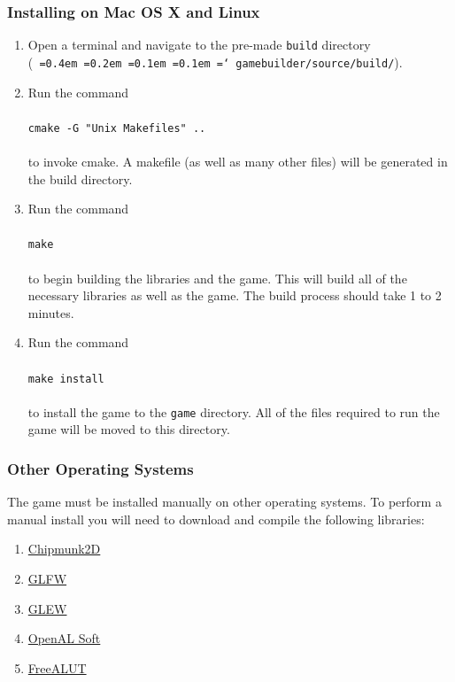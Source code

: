 \documentclass[12pt, titlepage]{article}
\newcommand*\justify{%
  \fontdimen2\font=0.4em%
  \fontdimen3\font=0.2em%
  \fontdimen4\font=0.1em%
  \fontdimen7\font=0.1em%
  \hyphenchar\font=`\-%
}
\begin{document}
\subsubsection{Installing on Mac OS X and Linux}


\begin{enumerate}
  \item Open a terminal and navigate to the pre-made \texttt{build} directory\\ (\texttt{\justify gamebuilder/source/build/}).
  \item Run the command\\\\
   ${}$\qquad \texttt{cmake -G "Unix Makefiles" ..}\\\\
    to invoke cmake.  A makefile (as well as many other files) will be generated in the build directory.

  \item Run the command\\\\
   ${}$\qquad \texttt{make}\\\\
    to begin building the libraries and the game.  This will build all of the necessary libraries as well as the game.  The build process should take 1 to 2 minutes.

  \item Run the command\\\\
  ${}$\qquad \texttt{make install}\\\\
  to install the game to the \texttt{game} directory.  All of the files required to run the game will be moved to this directory. 
\end{enumerate}

\subsubsection{Other Operating Systems}
The game must be installed manually on other operating systems.  To perform a manual install you will need to download and compile the following libraries:

\begin{enumerate}
  \item \href{https://chipmunk-physics.net/}{Chipmunk2D}
  \item \href{http://www.glfw.org/}{GLFW}
  \item \href{http://www.glew.org/}{GLEW}
  \item \href{http://kcat.strangesoft.net/openal.html}{OpenAL Soft}
  \item \href{https://github.com/vancegroup/freealut}{FreeALUT}
\end{enumerate}
\end{document}
